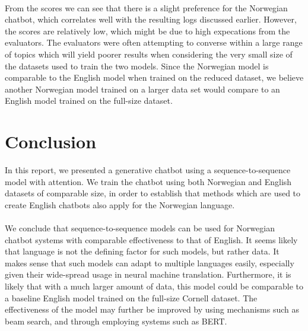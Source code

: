 \documentclass{article}
\begin{document}
\paragraph{}
From the scores we can see that there is a slight preference for the Norwegian
chatbot, which correlates well with the resulting logs discussed earlier.
However, the scores are relatively low, which might be due to high expecations
from the evaluators. The evaluators were often attempting to converse within
a large range of topics which will yield poorer results when considering the
very small size of the datasets used to train the two models. Since the
Norwegian model is comparable to the English model when trained on the reduced
dataset, we believe another Norwegian model trained on a larger data set would
compare to an English model trained on the full-size dataset.

\section*{Conclusion}

In this report, we presented a generative chatbot using a
sequence-to-sequence model with attention. We train the chatbot using both
Norwegian and English datasets of comparable size, in order to establish that
methods which are used to create English chatbots also apply for the Norwegian
language.

\paragraph{}
We conclude that sequence-to-sequence models can be used for Norwegian chatbot
systems with comparable effectiveness to that of English. It seems likely that
language is not the defining factor for such models, but rather data. It makes
sense that such models can adapt to multiple languages easily, especially
given their wide-spread usage in neural machine translation. Furthermore, it
is likely that with a much larger amount of data, this model could be
comparable to a baseline English model trained on the full-size Cornell
dataset. The effectiveness of the model may further be improved by using
mechanisms such as beam search, and through employing systems such as BERT.

\printbibliography
\end{document}
